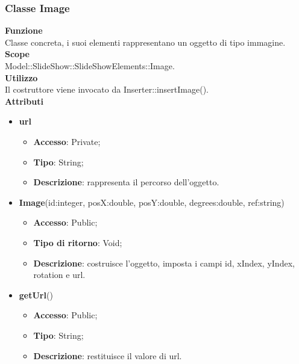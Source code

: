 {	\subsubsection{Classe Image}{
		\label{Image}
		\textbf{Funzione}\\
			\indent Classe concreta, i suoi elementi rappresentano un oggetto di tipo immagine.\\
	   	\textbf{Scope}\\
			\indent Model::SlideShow::SlideShowElements::Image.\\
		\textbf{Utilizzo}\\
			\indent Il costruttore viene invocato da Inserter::insertImage().\\
		\textbf{Attributi}
		\begin{itemize}
				\item \textbf{url}
				\begin{itemize}
					\item \textbf{Accesso}: Private;
					\item \textbf{Tipo}: String;
					\item \textbf{Descrizione}: rappresenta il percorso dell’oggetto.
				\end{itemize}
		\end{itemize}
		\begin{itemize}
			\item \textbf{Image}(id:integer, posX:double, posY:double, degrees:double, ref:string)
			\begin{itemize}
				\item \textbf{Accesso}: Public;
				\item \textbf{Tipo di ritorno}: Void;
				\item \textbf{Descrizione}: costruisce l’oggetto, imposta i campi id, xIndex, yIndex, rotation e url.
			\end{itemize}
			\item \textbf{getUrl}()
			\begin{itemize}
				\item \textbf{Accesso}: Public;
				\item \textbf{Tipo}: String;
				\item \textbf{Descrizione}: restituisce il valore di url.
			\end{itemize}
		\end{itemize}
		}
		
}
